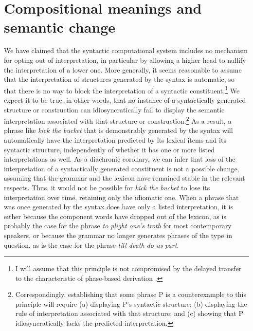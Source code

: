 \documentclass[output=paper,
modfonts
]{LSP/langsci}
\begin{document}
\section{Compositional meanings and semantic change}\label{composition}\label{sec:dechene:5}

We have claimed that the syntactic computational system includes no
mechanism for opting out of  interpretation, in particular
by allowing a higher head to nullify the interpretation of a lower one.
More generally, it seems reasonable to assume that the 
interpretation of structures generated by the syntax is automatic, so
that there is no way to block the  interpretation of a
syntactic constituent.\footnote{I will assume that this principle is not
  compromised by the delayed transfer to the  characteristic
  of phase-based derivation \citep{chomsky2001b}.} We expect it to be true, in
other words, that no instance of a syntactically generated structure or
construction can idiosyncratically fail to display the 
semantic interpretation associated with that structure or
construction.\footnote{Correspondingly, establishing that some phrase P
  is a counterexample to this principle will require (a) displaying P's
  syntactic structure; (b) displaying the rule of interpretation
  associated with that structure; and (c) showing that P
  idiosyncratically lacks the predicted interpretation.} As a result, a
phrase like \textit{kick the bucket} that is demonstrably generated by the
syntax will automatically have the  interpretation
predicted by its lexical items and its syntactic structure,
independently of whether it has one or more listed interpretations as
well. As a diachronic corollary, we can infer that loss of the
 interpretation of a syntactically generated constituent is
not a possible change, assuming that the grammar and the lexicon have
remained stable in the relevant respects. Thus, it would not be possible
for \textit{kick the bucket} to lose its  interpretation over
time, retaining only the idiomatic one. When a phrase that was once
generated by the syntax does have only a listed interpretation, it is
either because the component words have dropped out of the lexicon, as
is probably the case for the phrase \textit{to plight one's troth} for
most contemporary  speakers, or because the grammar no longer
generates phrases of the type in question, as is the case for the phrase
\textit{till death do us part.}
\end{document}
